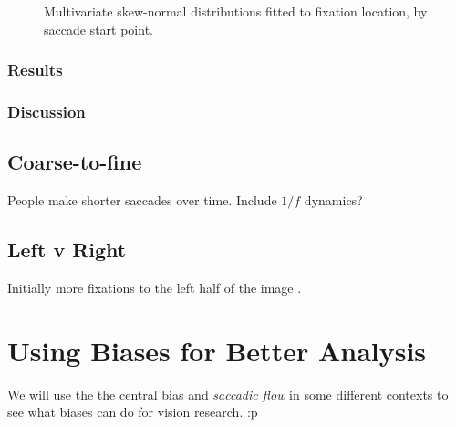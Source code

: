 \documentclass[a4paper, onecolumn, oneside, 11pt]{article}
\begin{document}
\begin{figure}
\caption{Multivariate skew-normal distributions fitted to fixation location, by saccade start point.}
\label{fig:exampleSkewNormal}
\end{figure}

\subsubsection{Results}


\subsubsection{Discussion}



\subsection{Coarse-to-fine}

People make shorter saccades over time. Include $1/f$ dynamics? 

\subsection{Left v Right}

Initially more fixations to the left half of the image \citep{nuthmann-matthias2014}.

\section{Using Biases for Better Analysis}

We will use the the central bias \citep{clarke-tatler2014} and \textit{saccadic flow} in some different contexts to see what biases can do for vision research. :p
\end{document}
